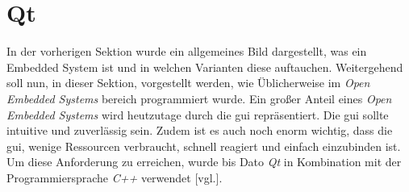 \section{Qt}
\label{sec:qt}
In der vorherigen Sektion wurde ein allgemeines Bild dargestellt, was ein Embedded System
ist und in welchen Varianten diese auftauchen. Weitergehend soll nun, in dieser Sektion,
vorgestellt werden, wie Üblicherweise im \emph{Open Embedded Systems} bereich programmiert
wurde.
\newline
\newline
Ein großer Anteil eines \emph{Open Embedded Systems} wird heutzutage durch die \ac{gui}
repräsentiert. Die \ac{gui} sollte intuitive und zuverlässig sein.
Zudem ist es auch noch enorm wichtig, dass die \ac{gui}, wenige Ressourcen verbraucht, schnell
reagiert und einfach einzubinden ist. Um diese Anforderung zu erreichen, wurde bis Dato \emph{Qt} in
Kombination mit der Programmiersprache \emph{C++} verwendet \cite{QtOnEmbeddedLinux}[vgl.].





